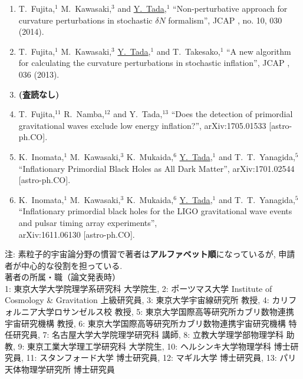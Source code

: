 \documentclass[11pt,a4paper,twoside]{jarticle}
\renewcommand{\emph}[1]{{\sffamily\gtfamily\bfseries #1}}
\renewcommand{\bf}{\bfseries\sffamily\gtfamily}
\newcommand{\研究課題名}{\mgfamily\sffamily インフレーション宇宙における曲率ゆらぎと原始ブラックホール形成}
\newcommand{\研究機関名}{\mgfamily\sffamily Institut d'Astrophysique de Paris}
\newcommand{\申請者氏名}{\mgfamily\sffamily 多田祐一郎}
\newcommand{\研究代表者氏名}{\申請者氏名}
\newcommand{\研究期間の最終元号年度}{32}	%
\begin{document}
{\begin{enumerate}
		\item T.~Fujita,$^1$ M.~Kawasaki,$^3$ and \underline{Y.~Tada},$^1$
  			``Non-perturbative approach for curvature perturbations in stochastic $\delta N$ formalism'',
  			JCAP {\bf 1410}, no. 10, 030 (2014).
			
		\item T.~Fujita,$^1$ M.~Kawasaki,$^3$ \underline{Y.~Tada},$^1$ and T.~Takesako,$^1$
  			``A new algorithm for calculating the curvature perturbations in stochastic inflation'',
  			JCAP {\bf 1312}, 036 (2013).
		
		\item[]\emph{\small (査読なし)}%
		
		\item T.~Fujita,$^{11}$ R.~Namba,$^{12}$ and Y.~Tada,$^{13}$
  			``Does the detection of primordial gravitational waves exclude low energy inflation?'',
  			arXiv:1705.01533 [astro-ph.CO].
		
		\item K.~Inomata,$^1$ M.~Kawasaki,$^3$ K.~Mukaida,$^6$ \underline{Y.~Tada},$^1$ and T.~T.~Yanagida,$^5$
  			``Inflationary Primordial Black Holes as All Dark Matter'',
  			arXiv:1701.02544 [astro-ph.CO].
		
		\item K.~Inomata,$^1$ M.~Kawasaki,$^3$ K.~Mukaida,$^6$ \underline{Y.~Tada},$^1$ and T.~T.~Yanagida,$^5$
  			``Inflationary primordial black holes for the LIGO gravitational wave events and pulsar timing array experiments'',\\
  			arXiv:1611.06130 [astro-ph.CO].
	
	\end{enumerate}
	{\footnotesize
	注: 素粒子的宇宙論分野の慣習で著者は\emph{アルファベット順}になっているが, 申請者が中心的な役割を担っている. \\[5pt]
	著者の所属・職（論文発表時）\\
	1: 東京大学大学院理学系研究科 大学院生,
	2: ポーツマス大学 Institute of Cosmology \& Gravitation 上級研究員,
	3: 東京大学宇宙線研究所 教授,
	4: カリフォルニア大学ロサンゼルス校 教授,
	5: 東京大学国際高等研究所カブリ数物連携宇宙研究機構 教授,
	6: 東京大学国際高等研究所カブリ数物連携宇宙研究機構 特任研究員,
	7: 名古屋大学大学院理学研究科 講師,
	8: 立教大学理学部物理学科 助教,
	9: 東京工業大学理工学研究科 大学院生,
	10: ヘルシンキ大学物理学科 博士研究員,
	11: スタンフォード大学 博士研究員,
	12: マギル大学 博士研究員,
	13: パリ天体物理学研究所 博士研究員
	}
	\vspace{3pt}
	
}
\end{document}
